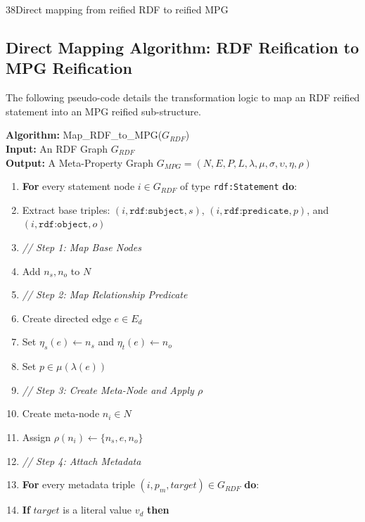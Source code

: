 \begin{question}{3}{8}{Direct mapping from reified RDF to reified MPG}
\subsection{Direct Mapping Algorithm: RDF Reification to MPG Reification}

The following pseudo-code details the transformation logic to map an RDF reified statement into an MPG reified sub-structure. 

\vspace{0.5em}
\noindent\hrulefill
\begin{flushleft}
\textbf{Algorithm:} Map\_RDF\_to\_MPG($G_{RDF}$) \\
\textbf{Input:} An RDF Graph $G_{RDF}$ \\
\textbf{Output:} A Meta-Property Graph $G_{MPG} = (N, E, P, L, \lambda, \mu, \sigma, \upsilon, \eta, \rho)$
\end{flushleft}
\vspace{-1.2em}
\noindent\hrulefill
\begin{enumerate}[leftmargin=*, noitemsep, topsep=4pt]
    \item \textbf{For} every statement node $i \in G_{RDF}$ of type \texttt{rdf:Statement} \textbf{do}:
    \item \quad Extract base triples: $(i, \texttt{rdf:subject}, s)$, $(i, \texttt{rdf:predicate}, p)$, and $(i, \texttt{rdf:object}, o)$
    \item \quad \textit{// Step 1: Map Base Nodes}
    \item \quad Add $n_s, n_o$ to $N$
    \item \quad \textit{// Step 2: Map Relationship Predicate}
    \item \quad Create directed edge $e \in E_d$
    \item \quad Set $\eta_s(e) \leftarrow n_s$ and $\eta_t(e) \leftarrow n_o$
    \item \quad Set $p \in \mu(\lambda(e))$
    \item \quad \textit{// Step 3: Create Meta-Node and Apply $\rho$}
    \item \quad Create meta-node $n_i \in N$
    \item \quad Assign $\rho(n_i) \leftarrow \{n_s, e, n_o\}$
    \item \quad \textit{// Step 4: Attach Metadata}
    \item \quad \textbf{For} every metadata triple $(i, p_m, target) \in G_{RDF}$ \textbf{do}:
    \item \quad \quad \textbf{If} $target$ is a literal value $v_d$ \textbf{then}

\end{enumerate}
\end{question}
